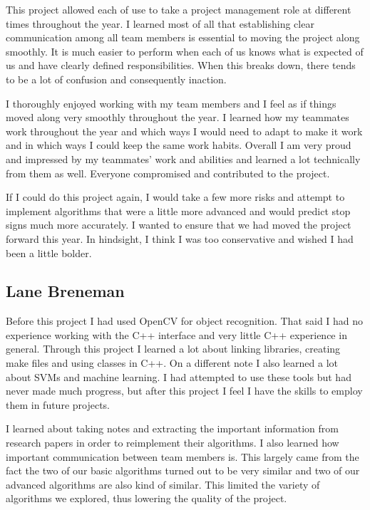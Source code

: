 \documentclass[letterpaper,10pt,titlepage]{article}
\begin{document}
This project allowed each of use to take a project management role at different
times throughout the year. I learned most of all that establishing clear 
communication among all team members is essential to moving the project along 
smoothly. It is much easier to perform when each of us knows what is expected
of us and have clearly defined responsibilities. When this breaks down, there 
tends to be a lot of confusion and consequently inaction. 

I thoroughly enjoyed working with my team members and I feel as if things 
moved along very smoothly throughout the year. I learned how my teammates work
throughout the year and which ways I would need to adapt to make it work and
in which ways I could keep the same work habits. Overall I am very proud and 
impressed by my teammates' work and abilities and learned a lot technically
from them as well. Everyone compromised and contributed to the project. 

If I could do this project again, I would take a few more risks and attempt to
implement algorithms that were a little more advanced and would predict stop 
signs much more accurately. I wanted to ensure that we had moved the project 
forward this year. In hindsight, I think I was too conservative and wished I 
had been a little bolder.

\subsection*{Lane Breneman}

Before this project I had used OpenCV for object recognition. That said I had
no experience working with the C++ interface and very little C++ experience in
general. Through this project I learned a lot about linking libraries, creating
make files and using classes in C++. On a different note I also learned a lot
about SVMs and machine learning. I had attempted to use these tools but had
never made much progress, but after this project I feel I have the skills to
employ them in future projects.

I learned about taking notes and extracting the important information from 
research papers in order to reimplement their algorithms. I also learned 
how important communication between team members is. This largely came from
the fact the two of our basic algorithms turned out to be very similar and 
two of our advanced algorithms are also kind of similar. This limited the
variety of algorithms we explored, thus lowering the quality of the project.
\end{document}
